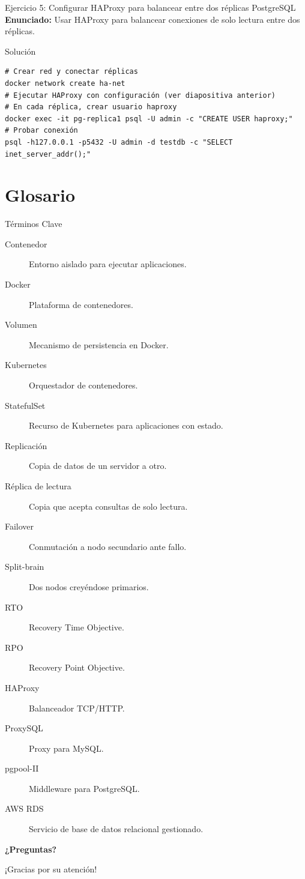 \documentclass[aspectratio=169, 10pt, xcolor=table]{beamer}
\begin{document}
\begin{frame}[fragile]{Ejercicio 5: Configurar HAProxy para balancear entre dos réplicas PostgreSQL}
    \textbf{Enunciado:} Usar HAProxy para balancear conexiones de solo lectura entre dos réplicas.
    \begin{block}{Solución}
        \begin{lstlisting}[style=bashstyle]
# Crear red y conectar réplicas
docker network create ha-net
# Ejecutar HAProxy con configuración (ver diapositiva anterior)
# En cada réplica, crear usuario haproxy
docker exec -it pg-replica1 psql -U admin -c "CREATE USER haproxy;"
# Probar conexión
psql -h127.0.0.1 -p5432 -U admin -d testdb -c "SELECT inet_server_addr();"
        \end{lstlisting}
    \end{block}
\end{frame}

\section{Glosario}

\begin{frame}{Términos Clave}
    \begin{description}
        \item[Contenedor] Entorno aislado para ejecutar aplicaciones.
        \item[Docker] Plataforma de contenedores.
        \item[Volumen] Mecanismo de persistencia en Docker.
        \item[Kubernetes] Orquestador de contenedores.
        \item[StatefulSet] Recurso de Kubernetes para aplicaciones con estado.
        \item[Replicación] Copia de datos de un servidor a otro.
        \item[Réplica de lectura] Copia que acepta consultas de solo lectura.
        \item[Failover] Conmutación a nodo secundario ante fallo.
        \item[Split-brain] Dos nodos creyéndose primarios.
        \item[RTO] Recovery Time Objective.
        \item[RPO] Recovery Point Objective.
        \item[HAProxy] Balanceador TCP/HTTP.
        \item[ProxySQL] Proxy para MySQL.
        \item[pgpool-II] Middleware para PostgreSQL.
        \item[AWS RDS] Servicio de base de datos relacional gestionado.
    \end{description}
\end{frame}

\begin{frame}
    \centering
    \Huge \textbf{¿Preguntas?}
    
    \vspace{1cm}
    \large ¡Gracias por su atención!
\end{frame}
\end{document}
